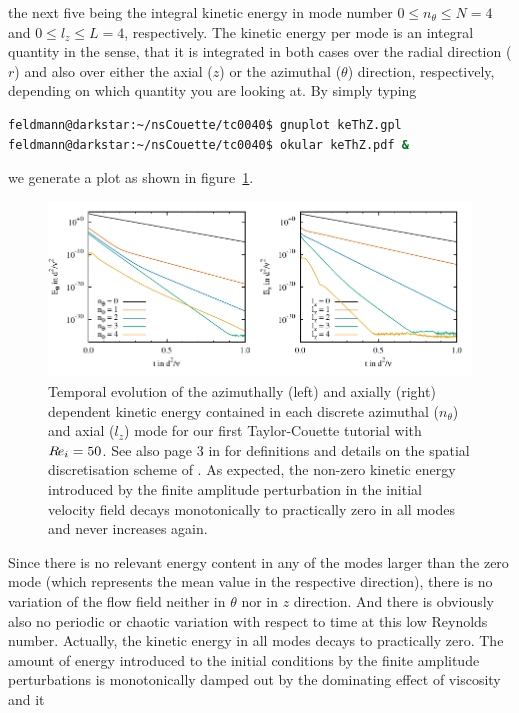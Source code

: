 \documentclass[a4paper, 11pt, DIV=11]{scrartcl}
\begin{document}
the next five being the integral kinetic energy in mode number
$\num{0}\le n_{\theta}\le N=\num{4}$ and $\num{0}\le l_{z}\le L=\num{4}$,
respectively. The kinetic energy per mode is an integral quantity in the sense,
that it is integrated in both cases over the radial direction ($r$) and also
over either the axial ($z$) or the azimuthal ($\theta$) direction, respectively,
depending on which quantity you are looking at.
By simply typing
\begin{lstlisting}[language=bash]
feldmann@darkstar:~/nsCouette/tc0040$ gnuplot keThZ.gpl
feldmann@darkstar:~/nsCouette/tc0040$ okular keThZ.pdf &
\end{lstlisting}
we generate a plot as shown in figure~\ref{fig:tc0040keThZ}.
\begin{figure}[htb]
\centering
\includegraphics[scale=1.00]{figures/tc0040/keThZ.pdf}
\caption{Temporal evolution of the azimuthally (left) and axially (right) 
dependent kinetic energy contained in each discrete azimuthal ($n_{\theta}$)
and axial ($l_{z}$) mode for our first Taylor-Couette tutorial 
with $R\hspace{-0.1em}e_{i}=\num{50}$. See also page 3 in \cite{Shi2015} for definitions and 
details on the spatial discretisation scheme of \nsc. As expected, the non-zero 
kinetic energy introduced by the finite amplitude perturbation in the initial 
velocity field decays monotonically to practically zero in all modes and never 
increases again.}
\label{fig:tc0040keThZ}
\end{figure}
Since there is no relevant energy content in any of the modes larger than the zero 
mode (which represents the mean value in the respective direction), there is no
variation of the flow field neither in $\theta$ nor in $z$ direction. And there is
obviously also no periodic or chaotic variation with respect to time at this low
Reynolds number. Actually, the kinetic energy in all modes decays to practically
zero. The amount of energy introduced to the initial conditions by the finite amplitude
perturbations is monotonically damped out by the dominating effect of viscosity and it
\end{document}
